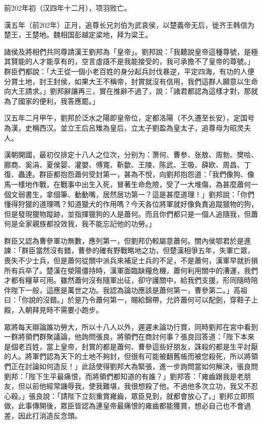前202年初（汉四年十二月），项羽败亡。

漢五年（前202年）正月，追尊长兄刘伯为武哀侯，以楚義帝无后，徙齐王韩信为楚王，王楚地。魏相国彭越定梁地，拜为梁王。

諸侯及將相們共同尊請漢王劉邦為「皇帝」。劉邦說：「我聽說皇帝這種尊號，是極其賢能的人才能享有的，空言虛語不是我能接受的，我可承擔不了皇帝的尊號。」群臣們都說：「大王從一個小老百姓的身分起兵討伐暴逆，平定四海，有功的人便分賞土地，封王封侯，如果大王不稱帝，封賞就沒有信用，我們這群人願意以生命向大王請求。」劉邦辭讓再三，實在推辭不過了，說：「諸君都認為這樣才對，那就為了國家的便利，我答應罷。」

汉五年二月甲午，劉邦於泛水之陽即皇帝位，定都洛陽（不久遷至长安），定国号為漢，史稱西汉。並立王后呂雉為皇后，立太子劉盈為皇太子，追尊母为昭灵夫人。

漢朝開國，最初仅排定十八人之位次，分别为：萧何、曹参、张敖、周勃、樊哙、郦商、奚涓、夏侯婴、灌嬰、傅寬、靳歙、王陵、陈武、王吸、薛欧、周昌、丁復、蟲達。群臣都抱怨蕭何受封第一，甚為不悅，向劉邦抱怨道：「我們像狗、像馬一樣地作戰，在戰事中出生入死，冒著生命危險，受了一大堆傷，為甚麼蕭何一個文弱書生，拿個筆、動動嘴，居然居功第一？這是甚麼道理！」劉邦說：「你們懂得狩獵的道理嗎？知道獵犬的作用嗎？今天各位將軍就好像負責追蹤獵物的狗，但是發現獵物蹤跡，並指揮獵狗的人是蕭何。而且你們都只是一個人追隨我，但蕭何是全家親族都投效我，我不能忘記他的功勞。」

群臣又認為曹參軍功無數，應列第一，但劉邦仍較屬意蕭何。關內侯鄂君於是進諫：「群臣當然沒有錯，曹參的確有野戰略地之功，但楚漢相爭五年，失軍亡眾，喪失不少士兵，但是蕭何從關中派兵來補足士兵的不足，不是蕭何，漢軍早就折損所有兵卒了。楚漢在滎陽僵持時，漢軍面臨缺糧危機，蕭何利用關中的漕運，我們才都有糧草可用。雖然蕭何沒有隨軍出征，卻守護關中，給我們支援，形同隨時陪伴陛下一般，這應是萬世之功。我認為論功應該是蕭何第一，曹參第二。」高祖曰：「你說的沒錯。」於是乃令蕭何第一，賜給錦帶，允許蕭何可以配劍，穿鞋子上殿，入朝拜見時不需要小跑步。

眾將每天辯論誰功勞大，所以十八人以外，遲遲未論功行賞，同時劉邦在宮中看到一群將領們群聚議論，他詢問張良，將領們在商討何事？張良回答道：「陛下本來是個老百姓，當上皇帝，封賞的都是蕭何、曹參這些好朋友，誅殺的都是生平討厭的人。將軍們認為天下的土地不夠封，但很有可能被翻舊帳而被您殺死，所以將領們正在討論如何造反！」此話使得劉邦大為緊張，進一步詢問當如何解決，張良問劉邦：「陛下生平最痛恨，而將領們都知道的有誰？」劉邦答：「雍齒跟我是老朋友，但以前他經常譏辱我，使我難堪，我很想殺了他。不過他多次立功，我又不忍心殺。」張良說：「請陛下立刻重賞雍齒，眾臣見到，就都會放心了。」劉邦立即照做，此事傳開後，眾臣皆認為連皇帝最痛恨的雍齒都能獲賞，想必自己也不會過差，因此打消造反念頭。

